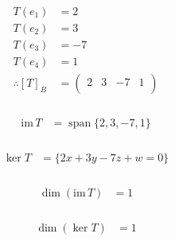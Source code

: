 \documentclass[fleqn, a4paper, twocolumn, draft]{article}
\DeclareMathOperator{\vspan}{\mathrm{span}} %
\theoremstyle{definition}
\theoremstyle{theorem}
\theoremstyle{remark}
\newcommand{\im}{\mathrm{im}\,}
\numberwithin{corollary}{theorem}
\numberwithin{equation}{theorem}
\begin{document}
\subsubsection{}

\begin{align*}
	T(e_1) &= 2\\
	T(e_2) &= 3\\
	T(e_3) &= -7\\
	T(e_4) &= 1\\
	\therefore [T]_B &= 
		\begin{pmatrix}
			2 & 3 & -7 & 1\\
		\end{pmatrix}
\end{align*}

\subsubsection{}

\begin{align*}
	\im T &= \vspan\{2, 3, -7, 1\}
\end{align*}

\subsubsection{}

\begin{align*}
	\ker T &= \{2x + 3y - 7z + w = 0\}
\end{align*}

\subsubsection{}

\begin{align*}
	\dim (\im T) &= 1
\end{align*}

\subsubsection{}

\begin{align*}
	\dim (\ker T) &= 1
\end{align*}
\end{document}

